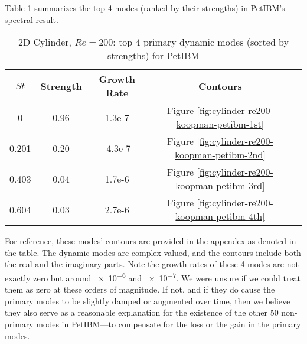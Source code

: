 Table \ref{table:koopman-petibm} summarizes the top 4 modes (ranked by their strengths) in PetIBM's spectral result.
\begin{table}
    \begin{threeparttable}[b]
        \begin{tabular}{ccccc}
            \toprule
            $St$ & Strength & Growth Rate & Contours \\
            \midrule
            0     & 0.96 & 1.3e-7  & Figure \ref{fig:cylinder-re200-koopman-petibm-1st}\\
            0.201 & 0.20 & -4.3e-7 & Figure \ref{fig:cylinder-re200-koopman-petibm-2nd}\\
            0.403 & 0.04 & 1.7e-6  & Figure \ref{fig:cylinder-re200-koopman-petibm-3rd}\\
            0.604 & 0.03 & 2.7e-6  & Figure \ref{fig:cylinder-re200-koopman-petibm-4th}\\
            \bottomrule
        \end{tabular}%
        \caption{%
            2D Cylinder, $Re=200$: top 4 primary dynamic modes (sorted by strengths) for PetIBM%
        }%
        \label{table:koopman-petibm}
    \end{threeparttable}
\end{table}%
For reference, these modes' contours are provided in the appendex as denoted in the table.
The dynamic modes are complex-valued, and the contours include both the real and the imaginary parts.
Note the growth rates of these 4 modes are not exactly zero but around \num{e-6} and \num{e-7}.
We were unsure if we could treat them as zero at these orders of magnitude.
If not, and if they do cause the primary modes to be slightly damped or augmented over time, then we believe they also serve as a reasonable explanation for the existence of the other 50 non-primary modes in PetIBM---to compensate for the loss or the gain in the primary modes.

